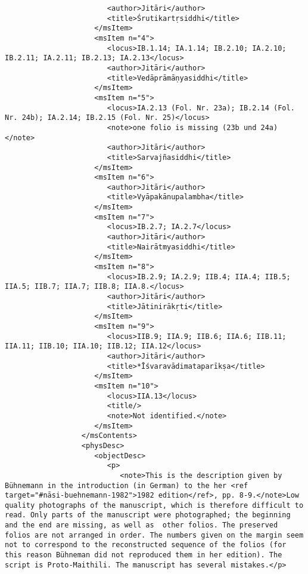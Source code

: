 \documentclass[article,12pt,a4paper]{memoir}%
\begin{document}
\begin{verbatim}
                        <author>Jitāri</author>
                        <title>Śrutikartṛsiddhi</title>
                     </msItem>
                     <msItem n="4">
                        <locus>IB.1.14; IA.1.14; IB.2.10; IA.2.10; IB.2.11; IA.2.11; IB.2.13; IA.2.13</locus>
                        <author>Jitāri</author>
                        <title>Vedāprāmāṇyasiddhi</title>
                     </msItem>
                     <msItem n="5">
                        <locus>IA.2.13 (Fol. Nr. 23a); IB.2.14 (Fol. Nr. 24b); IA.2.14; IB.2.15 (Fol. Nr. 25)</locus>
                        <note>one folio is missing (23b und 24a)</note>
                        <author>Jitāri</author>
                        <title>Sarvajñasiddhi</title>
                     </msItem>
                     <msItem n="6">
                        <author>Jitāri</author>
                        <title>Vyāpakānupalambha</title>
                     </msItem>
                     <msItem n="7">
                        <locus>IB.2.7; IA.2.7</locus>
                        <author>Jitāri</author>
                        <title>Nairātmyasiddhi</title>
                     </msItem>
                     <msItem n="8">
                        <locus>IB.2.9; IA.2.9; IIB.4; IIA.4; IIB.5; IIA.5; IIB.7; IIA.7; IIB.8; IIA.8.</locus>
                        <author>Jitāri</author>
                        <title>Jātinirākṛti</title>
                     </msItem>
                     <msItem n="9">
                        <locus>IIB.9; IIA.9; IIB.6; IIA.6; IIB.11; IIA.11; IIB.10; IIA.10; IIB.12; IIA.12</locus>
                        <author>Jitāri</author>
                        <title>*Īśvaravādimataparīkṣa</title>
                     </msItem>
                     <msItem n="10">
                        <locus>IIA.13</locus>
                        <title/>
                        <note>Not identified.</note>
                     </msItem>
                  </msContents>
                  <physDesc>
                     <objectDesc>
                        <p>
                           <note>This is the description given by Bühnemann in the introduction (in German) to the her <ref target="#nāsi-buehnemann-1982">1982 edition</ref>, pp. 8-9.</note>Low quality photographs of the manuscript, which is therefore difficult to read. Only parts of the manuscript were photographed; the beginning and the end are missing, as well as  other folios. The preserved folios are not arranged in order. The numbers given on the margin seem not to correspond to the reconstructed sequence of the folios (for this reason Bühneman did not reproduced them in her edition). The script is Proto-Maithili. The manuscript has several mistakes.</p>

\end{verbatim}
\end{document}
